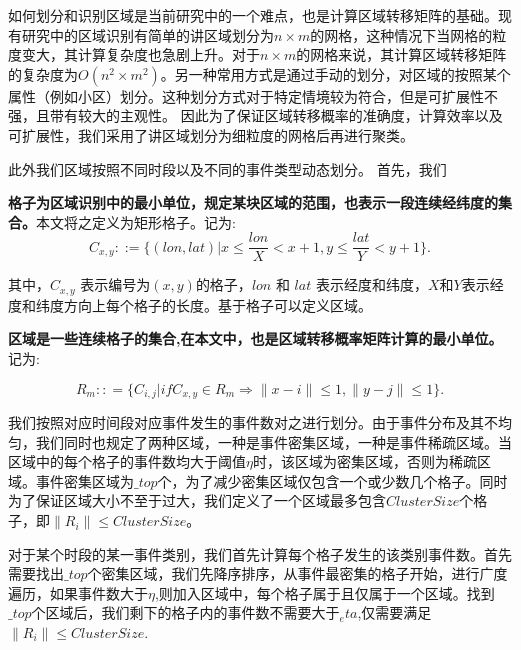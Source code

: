 
如何划分和识别区域是当前研究中的一个难点，也是计算区域转移矩阵的基础。现有研究中的区域识别有简单的讲区域划分为$n\times m$的网格，这种情况下当网格的粒度变大，其计算复杂度也急剧上升。对于$n\times m$的网格来说，其计算区域转移矩阵的复杂度为$O(n^2 \times m^2)$。另一种常用方式是通过手动的划分，对区域的按照某个属性（例如小区）划分。这种划分方式对于特定情境较为符合，但是可扩展性不强，且带有较大的主观性。
因此为了保证区域转移概率的准确度，计算效率以及可扩展性，我们采用了讲区域划分为细粒度的网格后再进行聚类。

此外我们区域按照不同时段以及不同的事件类型动态划分。
首先，我们
\begin{definition}
\label{cell}
\textbf{格子为区域识别中的最小单位，规定某块区域的范围，也表示一段连续经纬度的集合。}本文将之定义为矩形格子。记为:
\begin{equation}
C_{x,y}::=\{(lon,lat)|x \le \frac{{lon}}{{X}} < x + 1,
y \le \frac{{lat}}{{Y}} < y + 1\}.
\end{equation}
\end{definition}


其中，$C_{x,y}$ 表示编号为$(x,y)$的格子，$lon$ 和 $lat$ 表示经度和纬度，$X$和$Y$表示经度和纬度方向上每个格子的长度。基于格子可以定义区域。

\begin{definition}
\label{def_region}
\textbf{区域是一些连续格子的集合,在本文中，也是区域转移概率矩阵计算的最小单位。}记为:

\begin{equation}
R_m:: = \{ C_{i,j}|if C_{x,y} \in R_m
\Rightarrow \|x - i\| \le 1,\|y - j\| \le 1\}.
\end{equation}

\end{definition}

我们按照对应时间段对应事件发生的事件数对之进行划分。由于事件分布及其不均匀，我们同时也规定了两种区域，一种是事件密集区域，一种是事件稀疏区域。当区域中的每个格子的事件数均大于阈值$\eta$时，该区域为密集区域，否则为稀疏区域。事件密集区域为$\_top$个，为了减少密集区域仅包含一个或少数几个格子。同时为了保证区域大小不至于过大，我们定义了一个区域最多包含$ClusterSize$个格子，即$\|R_i\|\leq ClusterSize$。

对于某个时段的某一事件类别，我们首先计算每个格子发生的该类别事件数。首先需要找出$\_top$个密集区域，我们先降序排序，从事件最密集的格子开始，进行广度遍历，如果事件数大于$\eta$,则加入区域中，每个格子属于且仅属于一个区域。找到$\_top$个区域后，我们剩下的格子内的事件数不需要大于$_eta$,仅需要满足$\|R_i\|\leq ClusterSize$.

